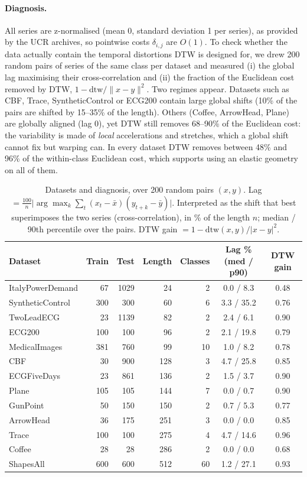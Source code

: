 \documentclass[11pt]{article}
\begin{document}
\paragraph{Diagnosis.}
All series are z-normalised (mean 0, standard deviation 1 per series), as provided by the UCR archives, so pointwise costs $\delta_{i,j}$ are $O(1)$. To check whether the data actually contain the temporal distortions DTW is designed for, we drew 200 random pairs of series of the same class per dataset and measured (i) the global lag maximising their cross-correlation and (ii) the fraction of the Euclidean cost removed by DTW, $1-\mathrm{dtw}/\|x-y\|^2$. Two regimes appear. Datasets such as CBF, Trace, SyntheticControl or ECG200 contain large global shifts (10\% of the pairs are shifted by 15--35\% of the length). Others (Coffee, ArrowHead, Plane) are globally aligned (lag $0$), yet DTW still removes 68--90\% of the Euclidean cost: the variability is made of \emph{local} accelerations and stretches, which a global shift cannot fix but warping can. In every dataset DTW removes between 48\% and 96\% of the within-class Euclidean cost, which supports using an elastic geometry on all of them.

\begin{table}[t]
\centering\small
\caption{Datasets and diagnosis, over 200 random pairs $(x,y)$. Lag $=\frac{100}{n}\big|\arg\max_k \sum_t (x_t-\bar x)(y_{t+k}-\bar y)\big|$. Interpreted as the shift that best superimposes the two series (cross-correlation), in \% of the length $n$; median / 90th percentile over the pairs. DTW gain $=1-\mathrm{dtw}(x,y)/|x-y|^2$.}
\label{tab:data}
\begin{tabular}{lrrrrcc}
\toprule
Dataset & Train & Test & Length & Classes & Lag \% (med / p90) & DTW gain \\
\midrule
ItalyPowerDemand & 67 & 1029 & 24 & 2 & 0.0 / 8.3 & 0.48 \\
SyntheticControl & 300 & 300 & 60 & 6 & 3.3 / 35.2 & 0.76 \\
TwoLeadECG & 23 & 1139 & 82 & 2 & 2.4 / 6.1 & 0.90 \\
ECG200 & 100 & 100 & 96 & 2 & 2.1 / 19.8 & 0.79 \\
MedicalImages & 381 & 760 & 99 & 10 & 1.0 / 8.2 & 0.78 \\
CBF & 30 & 900 & 128 & 3 & 4.7 / 25.8 & 0.85 \\
ECGFiveDays & 23 & 861 & 136 & 2 & 1.5 / 3.7 & 0.90 \\
Plane & 105 & 105 & 144 & 7 & 0.0 / 0.7 & 0.90 \\
GunPoint & 50 & 150 & 150 & 2 & 0.7 / 5.3 & 0.77 \\
ArrowHead & 36 & 175 & 251 & 3 & 0.0 / 0.0 & 0.85 \\
Trace & 100 & 100 & 275 & 4 & 4.7 / 14.6 & 0.96 \\
Coffee & 28 & 28 & 286 & 2 & 0.0 / 0.0 & 0.68 \\
ShapesAll & 600 & 600 & 512 & 60 & 1.2 / 27.1 & 0.93 \\
\bottomrule
\end{tabular}
\end{table}
\end{document}
